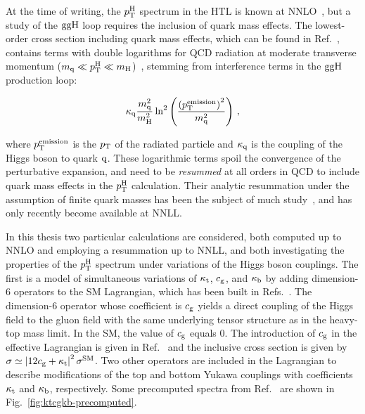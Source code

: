 % 
At the time of writing, the $p_\mathrm{T}^\mathrm{H}$ spectrum in the HTL is known at NNLO~\cite{Boughezal:2015dra,Boughezal:2015aha,Chen:2016zka}, but a study of the $\mathrm{g}\mathrm{g}\mathrm{H}$ loop requires the inclusion of quark mass effects.
% 
The lowest-order cross section including quark mass effects, which can be found in Ref.~\cite{Ellis:1987xu}, contains terms with double logarithms for QCD radiation at moderate transverse momentum ($m_{\mathrm{q}} \ll p_\mathrm{T}^\mathrm{H} \ll m_{\mathrm{H}}$)~\cite{Baur:1989cm,Bishara:2016jga}, stemming from interference terms in the $\mathrm{g}\mathrm{g}\mathrm{H}$ production loop:
% 
\begin{linenomath*}
\begin{equation}
\kappa_{\mathrm{q}} \frac{m_{\mathrm{q}}^2}{m_{\mathrm{H}}^2}
    \ln^2 \left(
        \frac{
            \left( p_\mathrm{T}^\text{emission} \right)^2
            }{
            m_\mathrm{q}^2
            }
        \right)
\,,
\end{equation}
\end{linenomath*}
% 
where $p_\mathrm{T}^\text{emission}$ is the $p_\mathrm{T}$ of the radiated particle and $\kappa_{\mathrm{q}}$ is the coupling of the Higgs boson to quark $\mathrm{q}$.
% 
These logarithmic terms spoil the convergence of the perturbative expansion, and need to be \textit{resummed} at all orders in QCD to include quark mass effects in the $p_\mathrm{T}^\mathrm{H}$ calculation.
% 
Their analytic resummation under the assumption of finite quark masses has been the subject of much study~\cite{Bozzi:2003jy,Becher:2010tm,Mantler:2012bj,Grazzini:2013mca,Monni:2016ktx}, and has only recently become available at NNLL.


In this thesis two particular calculations are considered, both computed up to NNLO and employing a resummation up to NNLL, and both investigating the properties of the $p_\mathrm{T}^\mathrm{H}$ spectrum under variations of the Higgs boson couplings.
% 
The first is a model of simultaneous variations of $\kappa_{\mathrm{t}}$, $c_\mathrm{g}$, and $\kappa_{\mathrm{b}}$ by adding dimension-6 operators to the SM Lagrangian, which has been built in Refs.~\cite{Grazzini:2017szg,Grazzini:2016paz}.
% 
The dimension-6 operator whose coefficient is $c_\mathrm{g}$ yields a direct coupling of the Higgs field to the gluon field with the same underlying tensor structure as in the heavy-top mass limit.
% 
In the SM, the value of $c_\mathrm{g}$ equals 0.
% 
The introduction of $c_\mathrm{g}$ in the effective Lagrangian is given in Ref.~\cite{Grazzini:2016paz} and the inclusive cross section is given by $\sigma \simeq \left| 12c_\mathrm{g} + \kappa_{\mathrm{t}} \right|^2 \sigma^\text{SM}$.
% 
Two other operators are included in the Lagrangian to describe modifications of the top and bottom Yukawa couplings with coefficients $\kappa_{\mathrm{t}}$ and $\kappa_{\mathrm{b}}$, respectively.
% 
Some precomputed spectra from Ref.~\cite{Grazzini:2017szg} are shown in Fig.~\ref{fig:ktcgkb-precomputed}.


